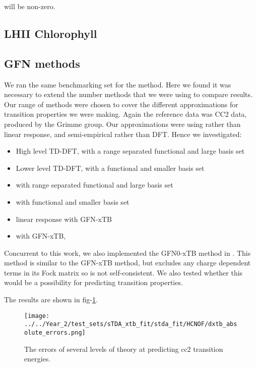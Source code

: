 will be non-zero.

\subsection{LHII Chlorophyll}
\label{subsec:dscf_chl_tests}

\subsection{GFN methods}
\label{subsec:dscf_gfn_tests}
We ran the same benchmarking set for the \dxtb method. Here we found it was 
necessary to extend the number methods that we were using to compare results.
Our range of methods were chosen to cover the different approximations for
transition properties we were making. Again the reference data was CC2 data, 
produced by the Grimme group. Our approximations were using \dscf rather than
linear response, and semi-empirical rather than DFT. Hence we investigated:
\begin{itemize}
    \item High level TD-DFT, with a range separated functional and large basis set
    \item Lower level TD-DFT, with a functional and smaller basis set
    \item \dscf with range separated functional and large basis set
    \item \dscf with functional and smaller basis set
    \item linear response with GFN-xTB
    \item \dscf with GFN-xTB, \dxtb
\end{itemize}

Concurrent to this work, we also implemented the GFN0-xTB method in .
This method is similar to the GFN-xTB method, but excludes any charge dependent
terms in its Fock matrix so is not self-consistent. We also tested whether this
would be a possibility for predicting transition properties.

The results are shown in fig-\ref{fig:dxtb_absolute_errors}.

\begin{figure}
    \label{fig:dxtb_absolute_errors}
    \texttt{[image: ../../Year\_2/test\_sets/sTDA\_xtb\_fit/stda\_fit/HCNOF/dxtb\_absolute\_errors.png]}
    \caption{The errors of several levels of theory at predicting cc2 transition
    energies.}
\end{figure}

